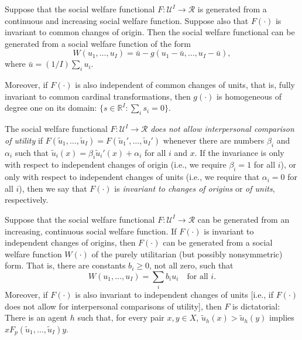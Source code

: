 \begin{prop}
    Suppose that the social welfare functional $F : \mathscr{U}^I \to \mathscr{R}$ is generated from a continuous and increasing social welfare function. Suppose also that $F(\cdot)$ is invariant to common changes of origin. Then the social welfare functional can be generated from a social welfare function of the form 
    \begin{equation*}
        W(u_1, \dots, u_I) = \bar{u} - g(u_1 - \bar{u}, \dots, u_I - \bar{u}),
    \end{equation*}
    where $\bar{u} = (1/I) \sum_i u_i$.

    Moreover, if $F(\cdot)$ is also independent of common changes of units, that is, fully invariant to common cardinal transformations, then $g(\cdot)$ is homogeneous of degree one on its domain: $\{s \in \mathbb{R}^I : \sum_i s_i = 0\}$.
\end{prop}

\begin{defn}
    The social welfare functional $F : \mathscr{U}^I \to \mathscr{R}$ \emph{does not allow interpersonal comparison of utility} if $F (\tilde{u}_1, \dots, \tilde{u}_I) = F (\tilde{u}_1', \dots, \tilde{u}_I')$ whenever there are numbers $\beta_i$ and $\alpha_i$ such that $\tilde{u}_i (x) = \beta_i \tilde{u}_i' (x) + \alpha_i$ for all $i$ and $x$. If the invariance is only with respect to independent changes of origin (i.e., we require $\beta_i = 1$ for all $i$), or only with respect to independent changes of units (i.e., we require that $\alpha_i = 0$ for all $i$), then we say that $F(\cdot)$ is \emph{invariant to changes of origins} or \emph{of units}, respectively.
\end{defn}

\begin{prop}
    Suppose that the social welfare functional $F : \mathscr{U}^I \to \mathscr{R}$ can be generated from an increasing, continuous social welfare function. If $F(\cdot)$ is invariant to independent changes of origins, then $F(\cdot)$ can be generated from a social welfare function $W(\cdot)$ of the purely utilitarian (but possibly nonsymmetric) form. That is, there are constants $b_i \geq 0$, not all zero, such that
    \begin{equation*}
        W(u_1, \dots, u_I) = \sum_i b_i u_i \quad \text{for all } i.
    \end{equation*}
    Moreover, if $F(\cdot)$ is also invariant to independent changes of units [i.e., if $F(\cdot)$ does not allow for interpersonal comparisons of utility], then $F$ is dictatorial: There is an agent $h$ such that, for every pair $x, y \in X$, $\tilde{u}_h(x) > \tilde{u}_h (y)$ implies $x F_p (\tilde{u}_1, \dots, \tilde{u}_I) y$.
\end{prop}


